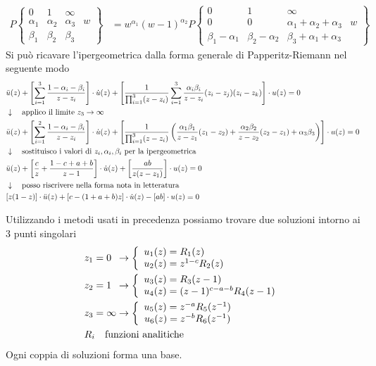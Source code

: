 \begin{align}
	P\left\{\begin{matrix}
		0 & 1 & \infty & \\
		\alpha_1 & \alpha_2 & \alpha_3& w\\
		\beta_1 & \beta_2 & \beta_3 & 
	\end{matrix}\right\} &= w^{\alpha_1}(w-1)^{\alpha_2}P\left\{\begin{matrix}
		0 & 1 & \infty & \\
		0 & 0 &  \alpha_1 + \alpha_2 + \alpha_3& w\\
		\beta_1-\alpha_1 & \beta_2-\alpha_2 & \beta_3 + \alpha_1  + \alpha_3& 
	\end{matrix}\right\}
\end{align}
Si può ricavare l'ipergeometrica dalla forma generale di Papperitz-Riemann nel seguente modo
\begin{align}
	&\ddot{u}(z) + \left[\sum_{i=1}^3\frac{1-\alpha_i - \beta_i}{z-z_i}\right]\cdot \dot{u}(z) + \left[\frac{1}{\prod_{i=1}^3(z-z_i)}\sum_{i=1}^3\frac{\alpha_i\beta_i}{z-z_i}(z_i-z_j)(z_i-z_k)\right] \cdot u(z)=0\\ &\downarrow \quad \text{applico il limite $z_3 \rightarrow \infty$} \nonumber \\	
	&\ddot{u}(z) + \left[\sum_{i=1}^2\frac{1-\alpha_i - \beta_i}{z-z_i}\right]\cdot \dot{u}(z) + \left[\frac{1}{\prod_{i=1}^3(z-z_i)}\left(\frac{\alpha_1\beta_1}{z-z_1}(z_1-z_2) + \frac{\alpha_2\beta_2}{z-z_2}(z_2-z_1) + \alpha_3\beta_3\right)\right] \cdot u(z)=0\nonumber \\ &\downarrow \quad \text{sostituisco i valori di $z_i,\alpha_i,\beta_i$ per la ipergeometrica} \nonumber \\
	&\ddot{u}(z) + \left[\frac{c}{z} + \frac{1-c+a+b}{z-1}\right]\cdot \dot{u}(z) + \left[\frac{ab}{z(z-z_1)}\right] \cdot u(z)=0\nonumber \\ &\downarrow \quad \text{posso riscrivere nella forma nota in letteratura} \nonumber \\
	&[z(1-z)]\cdot \ddot{u}(z)  + [c-(1+a+b)z] \cdot \dot{u}(z) - [ab]\cdot u(z) = 0 \label{ipergeom}
\end{align}

\newpage
{}
Utilizzando i metodi usati in precedenza possiamo trovare due soluzioni intorno ai 3 punti singolari
\begin{align}
	&z_1 = 0 \;\: \to \double{u_1(z) = R_1(z)\hfill}  	       {u_2(z) = z^{1-c}R_2(z)}\\
	&z_2 = 1 \;\: \to \double{u_3(z) = R_3(z-1)\hfill}         {u_4(z) = (z-1)^{c-a-b}R_4(z-1)}\\
	&z_3 = \infty \to \double{u_5(z) = z^{-a}R_5(z^{-1})\hfill}{u_6(z) = z^{-b}R_6(z^{-1})}\\
	&R_i \quad \text{funzioni analitiche}	
\end{align}
Ogni coppia di soluzioni forma una base.

